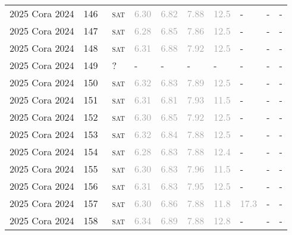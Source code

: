\begin{center}
{\begin{longtable}{@{}llllllllll@{}}
2025 Cora 2024 & 146 & ~\textsc{sat} & \textcolor{darkgray}{6.30} & \textcolor{darkgray}{6.82} & \textcolor{darkgray}{7.88} & \textcolor{darkgray}{12.5} & - & - & - \\
2025 Cora 2024 & 147 & ~\textsc{sat} & \textcolor{darkgray}{6.28} & \textcolor{darkgray}{6.85} & \textcolor{darkgray}{7.86} & \textcolor{darkgray}{12.5} & - & - & - \\
2025 Cora 2024 & 148 & ~\textsc{sat} & \textcolor{darkgray}{6.31} & \textcolor{darkgray}{6.88} & \textcolor{darkgray}{7.92} & \textcolor{darkgray}{12.5} & - & - & - \\
2025 Cora 2024 & 149 & ~? & - & - & - & - & - & - & - \\
2025 Cora 2024 & 150 & ~\textsc{sat} & \textcolor{darkgray}{6.32} & \textcolor{darkgray}{6.83} & \textcolor{darkgray}{7.89} & \textcolor{darkgray}{12.5} & - & - & - \\
2025 Cora 2024 & 151 & ~\textsc{sat} & \textcolor{darkgray}{6.31} & \textcolor{darkgray}{6.81} & \textcolor{darkgray}{7.93} & \textcolor{darkgray}{11.5} & - & - & - \\
2025 Cora 2024 & 152 & ~\textsc{sat} & \textcolor{darkgray}{6.30} & \textcolor{darkgray}{6.85} & \textcolor{darkgray}{7.92} & \textcolor{darkgray}{12.5} & - & - & - \\
2025 Cora 2024 & 153 & ~\textsc{sat} & \textcolor{darkgray}{6.32} & \textcolor{darkgray}{6.84} & \textcolor{darkgray}{7.88} & \textcolor{darkgray}{12.5} & - & - & - \\
2025 Cora 2024 & 154 & ~\textsc{sat} & \textcolor{darkgray}{6.28} & \textcolor{darkgray}{6.83} & \textcolor{darkgray}{7.88} & \textcolor{darkgray}{12.4} & - & - & - \\
2025 Cora 2024 & 155 & ~\textsc{sat} & \textcolor{darkgray}{6.30} & \textcolor{darkgray}{6.83} & \textcolor{darkgray}{7.96} & \textcolor{darkgray}{11.5} & - & - & - \\
2025 Cora 2024 & 156 & ~\textsc{sat} & \textcolor{darkgray}{6.31} & \textcolor{darkgray}{6.83} & \textcolor{darkgray}{7.95} & \textcolor{darkgray}{12.5} & - & - & - \\
2025 Cora 2024 & 157 & ~\textsc{sat} & \textcolor{darkgray}{6.30} & \textcolor{darkgray}{6.86} & \textcolor{darkgray}{7.88} & \textcolor{darkgray}{11.8} & \textcolor{darkgray}{17.3} & - & - \\
2025 Cora 2024 & 158 & ~\textsc{sat} & \textcolor{darkgray}{6.34} & \textcolor{darkgray}{6.89} & \textcolor{darkgray}{7.88} & \textcolor{darkgray}{12.8} & - & - & - \\

\end{longtable}}
\end{center}
